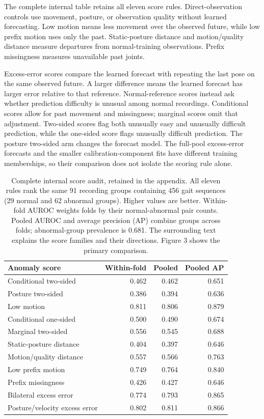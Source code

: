 \documentclass[letterpaper]{article}
\begin{document}
The complete internal table retains all eleven score rules. Direct-observation controls use movement, posture, or observation quality without learned forecasting. Low motion means less movement over the observed future, while low prefix motion uses only the past. Static-posture distance and motion/quality distance measure departures from normal-training observations. Prefix missingness measures unavailable past joints.

Excess-error scores compare the learned forecast with repeating the last pose on the same observed future. A larger difference means the learned forecast has larger error relative to that reference. Normal-reference scores instead ask whether prediction difficulty is unusual among normal recordings. Conditional scores allow for past movement and missingness; marginal scores omit that adjustment. Two-sided scores flag both unusually easy and unusually difficult prediction, while the one-sided score flags unusually difficult prediction. The posture two-sided arm changes the forecast model. The full-pool excess-error forecasts and the smaller calibration-component fits have different training memberships, so their comparison does not isolate the scoring rule alone.

\begin{table}[t]
\centering
\footnotesize
\setlength{\tabcolsep}{3pt}
\begin{tabular}{>{\raggedright\arraybackslash}p{}rrr}
\toprule
Anomaly score & Within-fold & Pooled & Pooled AP \\
\midrule
Conditional two-sided & 0.462 & 0.462 & 0.651 \\
Posture two-sided & 0.386 & 0.394 & 0.636 \\
Low motion & 0.811 & 0.806 & 0.879 \\
Conditional one-sided & 0.500 & 0.490 & 0.674 \\
Marginal two-sided & 0.556 & 0.545 & 0.688 \\
Static-posture distance & 0.404 & 0.397 & 0.646 \\
Motion/quality distance & 0.557 & 0.566 & 0.763 \\
Low prefix motion & 0.749 & 0.764 & 0.840 \\
Prefix missingness & 0.426 & 0.427 & 0.646 \\
Bilateral excess error & 0.774 & 0.793 & 0.865 \\
Posture/velocity excess error & 0.802 & 0.811 & 0.866 \\
\bottomrule
\end{tabular}
\caption{Complete internal score audit, retained in the appendix. All eleven rules rank the same 91 recording groups containing 456 gait sequences (29 normal and 62 abnormal groups). Higher values are better. Within-fold AUROC weights folds by their normal-abnormal pair counts. Pooled AUROC and average precision (AP) combine groups across folds; abnormal-group prevalence is 0.681. The surrounding text explains the score families and their directions. Figure 3 shows the primary comparison.}
\label{tab:rankings}
\end{table}
\end{document}
